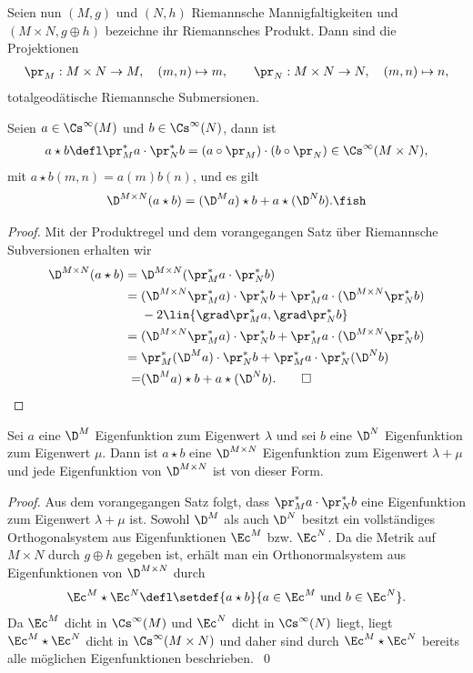 \documentclass[%
	paper=a5,%
	fleqn,%
	DIV=18,%
	BCOR=0mm,
	fontsize=11pt,
	titlepage=false,%
	bibliography=totoc,
	DIV=18,%
	twoside=true,
	pdftitle=Riemannsche Geometrie,
	pdfauthor=Uwe Semmelmann,
	numbers=noendperiod]%
	{scrbook}
\begin{document}
Seien nun $(M,g)$ und $(N,h)$ Riemannsche Mannigfaltigkeiten und $(M\times N,g\oplus h)$ bezeichne ihr Riemannsches Produkt. Dann sind die Projektionen
\begin{align*}
\pr_{M}: M\times N\to M,\quad (m,n)\mapsto m,\qquad
\pr_{N}: M\times N\to N,\quad (m,n)\mapsto n,
\end{align*}
totalgeodätische Riemannsche Submersionen. 

\begin{prop}
Seien $a\in\Cs^\infty(M)$ und $b\in\Cs^\infty(N)$, dann ist
\begin{align*}
a\star b\defl
\pr_{M}^*a \cdot \pr_{N}^*b = (a\circ\pr_{M})\cdot (b\circ \pr_{N})\in\Cs^\infty(M\times N),
\end{align*}
mit $a\star b(m,n) = a(m)b(n)$, und es gilt
\begin{align*}
\D^{M\times N}(a\star b) = 
(\D^M a)\star b + 
a\star (\D^N b).\fish
\end{align*}
\end{prop}
\begin{proof}
Mit der Produktregel und dem vorangegangen Satz über Riemannsche Subversionen erhalten wir
\begin{align*}
\D^{M\times N}(a\star b) = { } &
\D^{M\times N}(\pr_{M}^*a \cdot \pr_{N}^*b)\\ = { } & 
(\D^{M\times N}\pr_{M}^*a)\cdot \pr_{N}^*b + 
\pr_{M}^*a\cdot (\D^{M\times N}\pr_{N}^*b)\\
&-2\lin{\grad \pr_{M}^* a ,\grad \pr_{N}^*b}\\
= { } & 
(\D^{M\times N}\pr_{M}^*a)\cdot \pr_{N}^*b + 
\pr_{M}^*a\cdot (\D^{M\times N}\pr_{N}^*b)\\
= { } & 
\pr_{M}^*(\D^Ma)\cdot \pr_{N}^*b
+
\pr_{M}^* a\cdot \pr_{N}^* (\D^N b)\\
{ } = &
(\D^Ma)\star b
+
a\star (\D^N b).\qed
\end{align*}
\end{proof}

\begin{cor}
Sei $a$ eine $\D^M$ Eigenfunktion zum Eigenwert $\lambda$ und sei $b$ eine $\D^N$ Eigenfunktion zum Eigenwert $\mu$. Dann ist $a\star b$ eine $\D^{M\times N}$ Eigenfunktion zum Eigenwert $\lambda+\mu$ und jede Eigenfunktion von $\D^{M\times N}$ ist von dieser Form.\fish
\end{cor}
\begin{proof}
Aus dem vorangegangen Satz folgt, dass $\pr_{M}^* a\cdot \pr_{N}^* b$ eine Eigenfunktion zum Eigenwert $\lambda+\mu$ ist. 
Sowohl $\D^M$ als auch $\D^N$ besitzt ein vollständiges Orthogonalsystem aus Eigenfunktionen $\Ec^M$ bzw. $\Ec^N$.
Da die Metrik auf $M\times N$ durch $g\oplus h$ gegeben ist, erhält man ein Orthonormalsystem aus Eigenfunktionen von $\D^{M\times N}$ durch
\begin{align*}
\Ec^M\star \Ec^N\defl \setdef{a\star b}{a\in \Ec^M\text{ und }b\in\Ec^N}.
\end{align*}
Da $\Ec^M$ dicht in $\Cs^\infty(M)$ und $\Ec^N$ dicht in $\Cs^\infty(N)$ liegt, liegt $\Ec^M\star \Ec^N$ dicht in $\Cs^\infty(M\times N)$ und daher sind durch $\Ec^M\star \Ec^N$ bereits alle möglichen Eigenfunktionen beschrieben.~\qed
\end{proof}
\end{document}
